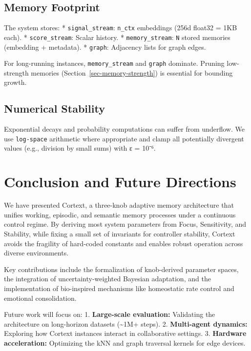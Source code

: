 \documentclass[
  letterpaper,
  DIV=11,
  numbers=noendperiod]{scrartcl}
\begin{document}
\subsection{Memory Footprint}\label{memory-footprint}

The system stores: * \texttt{signal\_stream}: \texttt{n\_ctx} embeddings
(256d float32 = 1KB each). * \texttt{score\_stream}: Scalar history. *
\texttt{memory\_stream}: \texttt{N} stored memories (embedding +
metadata). * \texttt{graph}: Adjacency lists for graph edges.

For long-running instances, \texttt{memory\_stream} and \texttt{graph}
dominate. Pruning low-strength memories
(Section~\ref{sec-memory-strength}) is essential for bounding growth.

\subsection{Numerical Stability}\label{numerical-stability}

Exponential decays and probability computations can suffer from
underflow. We use \texttt{log-space} arithmetic where appropriate and
clamp all potentially divergent values (e.g., division by small sums)
with ε = 10⁻⁶.

\section{Conclusion and Future
Directions}\label{conclusion-and-future-directions}

We have presented Cortext, a three-knob adaptive memory architecture
that unifies working, episodic, and semantic memory processes under a
continuous control regime. By deriving most system parameters from
Focus, Sensitivity, and Stability, while fixing a small set of
invariants for controller stability, Cortext avoids the fragility of
hard-coded constants and enables robust operation across diverse
environments.

Key contributions include the formalization of knob-derived parameter
spaces, the integration of uncertainty-weighted Bayesian adaptation, and
the implementation of bio-inspired mechanisms like homeostatic rate
control and emotional consolidation.

Future work will focus on: 1. \textbf{Large-scale evaluation:}
Validating the architecture on long-horizon datasets (\textasciitilde1M+
steps). 2. \textbf{Multi-agent dynamics:} Exploring how Cortext
instances interact in collaborative settings. 3. \textbf{Hardware
acceleration:} Optimizing the kNN and graph traversal kernels for edge
devices.
\end{document}
